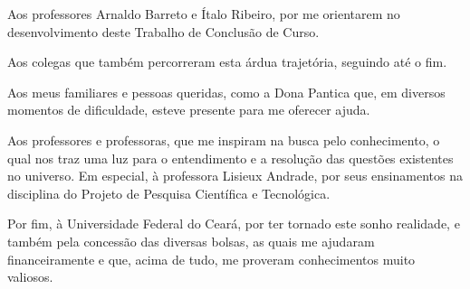 Aos professores Arnaldo Barreto e Ítalo Ribeiro, por me orientarem no desenvolvimento deste Trabalho de Conclusão de Curso.

Aos colegas que também percorreram esta árdua trajetória, seguindo até o fim.

Aos meus familiares e pessoas queridas, como a Dona Pantica que, em diversos momentos de dificuldade, esteve presente para me oferecer ajuda.

Aos professores e professoras, que me inspiram na busca pelo conhecimento, o qual nos traz uma luz para o entendimento e a resolução das questões existentes no universo. Em especial, à professora Lisieux Andrade, por seus ensinamentos na disciplina do Projeto de Pesquisa Científica e Tecnológica.

Por fim, à Universidade Federal do Ceará, por ter tornado este sonho realidade, e também pela concessão das diversas bolsas, as quais me ajudaram financeiramente e que, acima de tudo, me proveram conhecimentos muito valiosos.